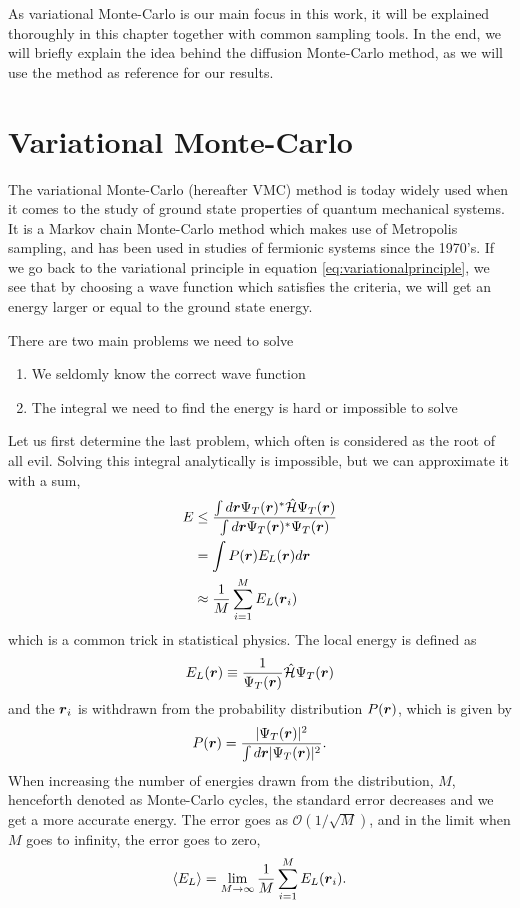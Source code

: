 As variational Monte-Carlo is our main focus in this work, it will be explained thoroughly in this chapter together with common sampling tools. In the end, we will briefly explain the idea behind the diffusion Monte-Carlo method, as we will use the method as reference for our results. 

\section{Variational Monte-Carlo} \label{subsec:vmc}
The variational Monte-Carlo (hereafter VMC) method is today widely used when it comes to the study of ground state properties of quantum mechanical systems. It is a Markov chain Monte-Carlo method which makes use of Metropolis sampling, and has been used in studies of fermionic systems since the 1970's. \cite{deb_variational_2014} If we go back to the variational principle in equation \eqref{eq:variationalprinciple}, we see that by choosing a wave function which satisfies the criteria, we will get an energy larger or equal to the ground state energy. \bigskip

There are two main problems we need to solve
\begin{enumerate}
	\item We seldomly know the correct wave function
	\item The integral we need to find the energy is hard or impossible to solve
\end{enumerate}
Let us first determine the last problem, which often is considered as the root of all evil. Solving this integral analytically is impossible, but we can approximate it with a sum,
\begin{align}
E &\leq \frac{\int d\boldsymbol{{r}}\Psi_T(\boldsymbol{{r}})^*\hat{\mathcal{H}}\Psi_T(\boldsymbol{{r}})}{\int d\boldsymbol{{r}}\Psi_T(\boldsymbol{{r}})^*\Psi_T(\boldsymbol{{r}})} \notag\\
& = \int P(\boldsymbol{{r}}) E_L(\boldsymbol{{r}}) d\boldsymbol{{r}} \notag\\
& \approx \frac{1}{M}\sum_{i=1}^ME_L(\boldsymbol{{r}}_i) \label{eq:energysum}
\end{align}
which is a common trick in statistical physics. The local energy is defined as
\begin{equation}
E_L(\boldsymbol{{r}})\equiv\frac{1}{\Psi_T(\boldsymbol{{r}})}\hat{\mathcal{H}}\Psi_T(\boldsymbol{{r}})
\label{eq:local energy}
\end{equation}
and the $\boldsymbol{{r}}_i$ is withdrawn from the probability distribution $P(\boldsymbol{{r}})$, which is given by
\begin{equation}
P(\boldsymbol{{r}})=\frac{|\Psi_T(\boldsymbol{{r}})|^2}{\int d\boldsymbol{{r}}|\Psi_T(\boldsymbol{{r}})|^2}.
\label{eq:probvmc}
\end{equation}
When increasing the number of energies drawn from the distribution, $M$, henceforth denoted as Monte-Carlo cycles, the standard error decreases and we get a more accurate energy. The error goes as $\mathcal{O}(1/\sqrt{M})$, and in the limit when $M$ goes to infinity, the error goes to zero,
\begin{equation}
\langle E_L\rangle=\lim_{M\to\infty} \frac{1}{M}\sum_{i=1}^ME_L(\boldsymbol{{r}}_i).
\end{equation}

